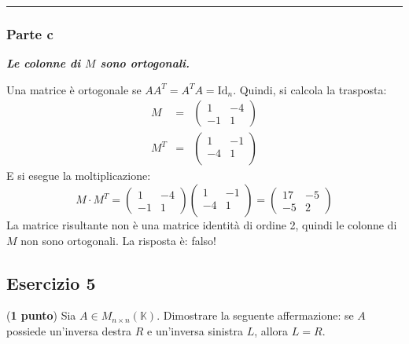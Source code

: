 \documentclass[a4paper]{article}
\newcommand{\longline}{\noindent\rule{\textwidth}{0.4pt}}
\begin{document}
	\longline

	\subsubsection{Parte c}

	\textcolor{Green4}{\textbf{\emph{Le colonne di $M$ sono ortogonali.}}}\newline

	\noindent
	Una matrice è ortogonale se $A A^{T} = A^{T}A = \mathrm{Id}_{n}$. Quindi, si calcola la trasposta:
	\begin{equation*}
		\begin{array}{rll}
			M &=& \begin{pmatrix}
				1  & -4 \\
				-1 & 1
			\end{pmatrix} \\
			M^{T} &=& \begin{pmatrix}
				1 & -1 \\
				-4 & 1 \\
			\end{pmatrix}
		\end{array}
	\end{equation*}
	E si esegue la moltiplicazione:
	\begin{equation*}
		M \cdot M^{T} = \begin{pmatrix}
			1  & -4 \\
			-1 & 1
		\end{pmatrix}
		\begin{pmatrix}
			1 & -1 \\
			-4 & 1 \\
		\end{pmatrix} = \begin{pmatrix}
			17 & -5 \\
			-5 & 2
		\end{pmatrix}
	\end{equation*}
	La matrice risultante non è una matrice identità di ordine 2, quindi le colonne di $M$ non sono ortogonali. La risposta è: falso!\newpage

	\subsection{Esercizio 5}

	(\textbf{1 punto}) Sia $A \in M_{n \times n}\left(\mathbb{K}\right)$. Dimostrare la seguente affermazione: se $A$ possiede un'inversa destra $R$ e un'inversa sinistra $L$, allora $L = R$.\newline
\end{document}
